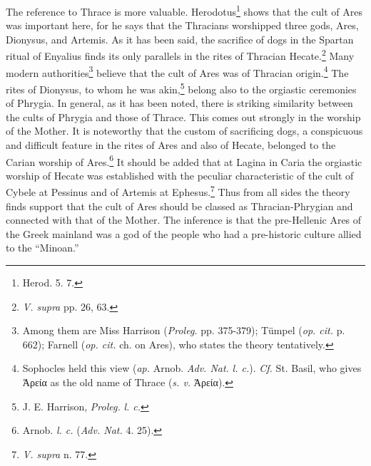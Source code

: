 \documentclass[a4paper, 12pt, oneside]{article}
\begin{document}
The reference to Thrace is more valuable. Herodotus\footnote{Herod. 5. 7.} shows that the cult of Ares was important here, for he says that the Thracians worshipped three gods, Ares, Dionysus, and Artemis. As it has been said, the sacrifice of dogs in the Spartan ritual of Enyalius finds its only parallels in the rites of Thracian Hecate.\footnote{\emph{V. supra} pp. 26, 63.} Many modern authorities\footnote{Among them are Miss Harrison (\emph{Proleg.} pp. 375-379); Tümpel (\emph{op. cit.} p. 662); Farnell (\emph{op. cit.} ch. on Ares), who states the theory tentatively.} believe that the cult of Ares was of Thracian origin.\footnote{Sophocles held this view (\emph{ap.} Arnob. \emph{Adv. Nat.} \emph{l. c.}). \emph{Cf.} St. Basil, who gives Ἀρεία as the old name of Thrace (\emph{s. v.} Ἀρεία).} The rites of Dionysus, to whom he was akin,\footnote{J. E. Harrison, \emph{Proleg.} \emph{l. c.}} belong also to the orgiastic ceremonies of Phrygia. In general, as it has been noted, there is striking similarity between the cults of Phrygia and those of Thrace. This comes out strongly in the worship of the Mother. It is noteworthy that the custom of sacrificing dogs, a conspicuous and difficult feature in the rites of Ares and also of Hecate, belonged to the Carian worship of Ares.\footnote{Arnob. \emph{l. c.} (\emph{Adv. Nat.} 4. 25).} It should be added that at Lagina in Caria the orgiastic worship of Hecate was established with the peculiar characteristic of the cult of Cybele at Pessinus and of Artemis at Ephesus.\footnote{\emph{V. supra} n. 77.} Thus from all sides the theory finds support that the cult of Ares should be classed as Thracian-Phrygian and connected with that of the Mother. The inference is that the pre-Hellenic Ares of the Greek mainland was a god of the people who had a pre-historic culture allied to the ``Minoan.''
\end{document}
